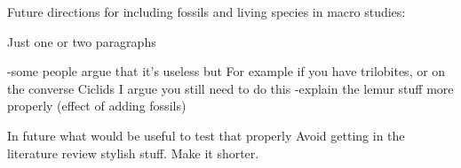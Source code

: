





Future directions for including fossils and living species in macro studies:

Just one or two paragraphs

-some people argue that it's useless but
For example if you have trilobites, or on the converse Ciclids
I argue you still need to do this
-explain the lemur stuff more properly (effect of adding fossils)

In future what would be useful to test that properly
Avoid getting in the literature review stylish stuff. Make it shorter.



